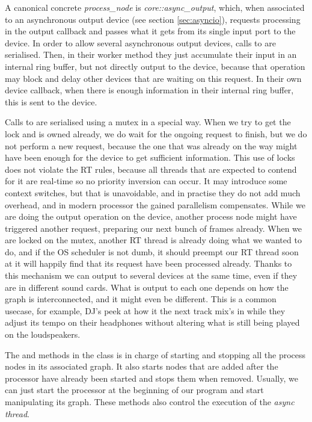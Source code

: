 A canonical concrete \emph{process\_node} is
\emph{core::async\_output}, which, when associated to an asynchronous
output device (see section \ref{sec:asyncio}), requests processing in
the output callback and passes what it gets from its single input port
to the device. In order to allow several asynchronous output devices,
calls to  are serialised. Then, in their
worker method they just accumulate their input in an internal ring
buffer, but not directly output to the device, because that operation
may block and delay other devices that are waiting on this request. In
their own device callback, when there is enough information in their
internal ring buffer, this is sent to the device.

Calls to  are serialised using a mutex in a
special way. When we try to get the lock and is owned already, we do
wait for the ongoing request to finish, but we do not perform a new
request, because the one that was already on the way might have been
enough for the device to get sufficient information. This use of locks
does not violate the RT rules, because all threads that are expected
to contend for it are real-time so no priority inversion can occur. It
may introduce some context switches, but that is unavoidable, and in
practise they do not add much overhead, and in modern processor the
gained parallelism compensates. While we are doing the output
operation on the device, another process node might have triggered
another request, preparing our next bunch of frames already. When we
are locked on the mutex, another RT thread is already doing what we
wanted to do, and if the OS scheduler is not dumb, it should preempt
our RT thread soon at it will happily find that its request have been
processed already. Thanks to this mechanism we can output to several
devices at the same time, even if they are in different sound
cards. What is output to each one depends on how the graph is
interconnected, and it might even be different. This is a common
usecase, for example, DJ's peek at how it the next track mix's in
while they adjust its tempo on their headphones without altering what
is still being played on the loudspeakers.

The  and  methods in the 
class is in charge of starting and stopping all the process nodes in
its associated graph. It also starts nodes that are added after the
processor have already been started and stops them when
removed. Usually, we can just start the processor at the beginning of
our program and start manipulating its graph. These methods also
control the execution of the \emph{async thread}. 

